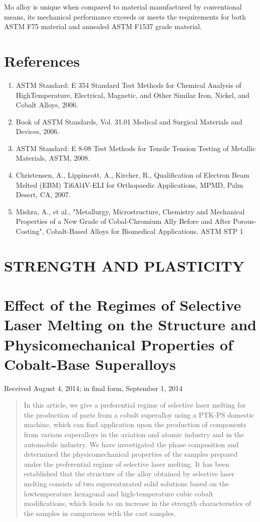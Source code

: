 \documentclass[10pt]{article}
\begin{document}
Mo alloy is unique when compared to material manufactured by conventional means, its mechanical performance exceeds or meets the requirements for both ASTM F75 material and annealed ASTM F1537 grade material.

\section*{References}
\begin{enumerate}
  \item ASTM Standard: E 354 Standard Test Methods for Chemical Analysis of HighTemperature, Electrical, Magnetic, and Other Similar Iron, Nickel, and Cobalt Alloys, 2006.

  \item Book of ASTM Standards, Vol. 31.01 Medical and Surgical Materials and Devices, 2006.

  \item ASTM Standard: E 8-08 Test Methods for Tensile Tension Testing of Metallic Materials, ASTM, 2008.

  \item Christensen, A., Lippincott, A., Kircher, R., Qualification of Electron Beam Melted (EBM) Ti6Al4V-ELI for Orthopaedic Applications, MPMD, Palm Desert, CA, 2007.

  \item Mishra, A., et al., "Metallurgy, Microstructure, Chemistry and Mechanical Properties of a New Grade of Cobal-Chromium Ally Before and After Porous-Costing", Cobalt-Based Alloys for Biomedical Applications, ASTM STP 1

\end{enumerate}

\section*{STRENGTH AND PLASTICITY }
\section*{Effect of the Regimes of Selective Laser Melting on the Structure and Physicomechanical Properties of Cobalt-Base Superalloys}
Received August 4, 2014; in final form, September 1, 2014

\begin{abstract}
In this article, we give a preferential regime of selective laser melting for the production of parts from a cobalt superalloy using a PTK-PS domestic machine, which can find application upon the production of components from various superalloys in the aviation and atomic industry and in the automobile industry. We have investigated the phase composition and determined the physicomechanical properties of the samples prepared under the preferential regime of selective laser melting. It has been established that the structure of the alloy obtained by selective laser melting consists of two supersaturated solid solutions based on the lowtemperature hexagonal and high-temperature cubic cobalt modifications, which leads to an increase in the strength characteristics of the samples in comparison with the cast samples.
\end{abstract}
\end{document}
